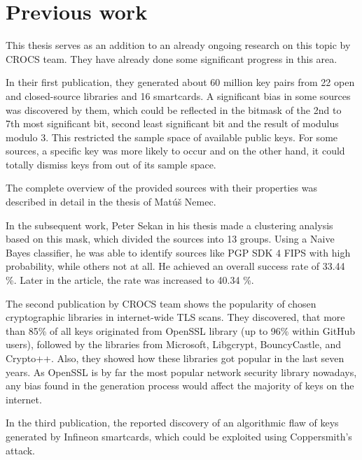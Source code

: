 \chapter{Previous work}
\label{chapter-prev-work}

This thesis serves as an addition to an already ongoing research on this topic by CROCS team. They have already done some significant progress in this area. 

In their first publication\cite{svenda_1}, they generated about 60 million key pairs from 22 open and closed-source libraries and 16 smartcards. A significant bias in some sources was discovered by them, which could be reflected in the bitmask of the 2nd to 7th most significant bit, second least significant bit and the result of modulus modulo 3. This restricted the sample space of available public keys. For some sources, a specific key was more likely to occur and on the other hand, it could totally dismiss keys from out of its sample space.

The complete overview of the provided sources with their properties was described in detail in the thesis of Mat\'{u}š Nemec\cite{thesis_matus_nemec}.

In the subsequent work, Peter Sekan in his thesis\cite{thesis_sekan} made a clustering analysis based on this mask, which divided the sources into 13 groups. Using a Naive Bayes classifier, he was able to identify sources like PGP SDK 4 FIPS with high probability, while others not at all. He achieved an overall success rate of 33.44 \%. Later in the article, the rate was increased to 40.34 \%.

The second publication by CROCS team\cite{svenda_3} shows the popularity of chosen cryptographic libraries in internet-wide TLS scans. They discovered, that more than 85\% of all keys originated from OpenSSL library (up to 96\% within GitHub users), followed by the libraries from Microsoft, Libgcrypt, BouncyCastle, and Crypto++. Also, they showed how these libraries got popular in the last seven years. As OpenSSL is by far the most popular network security library nowadays, any bias found in the generation process would affect the majority of keys on the internet.

In the third publication\cite{svenda_2}, the reported discovery of an algorithmic flaw of keys generated by Infineon smartcards, which could be exploited using Coppersmith's attack. 
